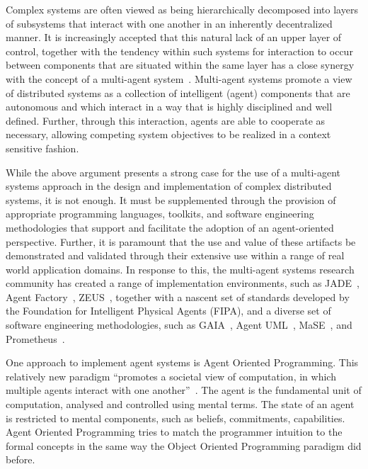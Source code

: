 \documentclass[a4paper,12pt,oneside,fleqn]{book} %
\theoremstyle{plain}
\theoremstyle{definition}
\theoremstyle{remark}
\begin{document}
Complex systems are often viewed as being hierarchically decomposed into layers
of subsystems that interact with one another in an inherently decentralized
manner. It is increasingly accepted that this natural lack of an upper layer of
control, together with the tendency within such systems for interaction to
occur between components that are situated within the same layer has a close
synergy with the concept of a multi-agent
system~\cite{Jennings00agent-orientedsoftware}. Multi-agent systems promote a
view of distributed systems as a collection of intelligent (agent) components
that are autonomous and which interact in a way that is highly disciplined and
well defined. Further, through this interaction, agents are able to cooperate
as necessary, allowing competing system objectives to be realized in a context
sensitive fashion.

While the above argument presents a strong case for the use of a multi-agent
systems approach in the design and implementation of complex distributed
systems, it is not enough. It must be supplemented through the provision of
appropriate programming languages, toolkits, and software engineering
methodologies that support and facilitate the adoption of an agent-oriented
perspective. Further, it is paramount that the use and value of these artifacts
be demonstrated and validated through their extensive use within a range of
real world application domains. In response to this, the multi-agent systems
research community has created a range of implementation environments, such as
JADE~\cite{DBLP:books/sp/map2005/BellifemineBCP05}, Agent
Factory~\cite{collier1999agent}, ZEUS~\cite{DBLP:conf/agents/NwanaNLC99},
together with a nascent set of standards developed by the Foundation for
Intelligent Physical Agents (FIPA), and a diverse set of software engineering
methodologies, such as GAIA~\cite{DBLP:journals/aamas/WooldridgeJK00}, Agent
UML~\cite{bauer2001agent}, MaSE~\cite{deloach2001analysis}, and
Prometheus~\cite{DBLP:conf/atal/PadghamW02}.

One approach to implement agent systems is Agent Oriented Programming.
This relatively new paradigm ``promotes a societal view of computation, in
which multiple agents interact with one
another''~\cite{DBLP:journals/ai/Shoham93}.  The agent is the fundamental
unit of computation, analysed and controlled using mental terms.  The state
of an agent is restricted to mental components, such as beliefs,
commitments, capabilities. Agent Oriented Programming tries to match the
programmer intuition to the formal concepts in the same way the Object
Oriented Programming paradigm did before.
\end{document}
